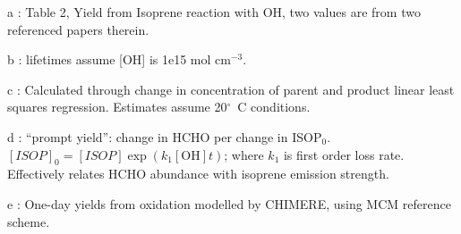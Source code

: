 \begin{table}
\begin{threeparttable}
\begin{tabular}{  l  l  l  l  }
            \bottomrule
          \end{tabular}
          \begin{tablenotes} %
            \item a \textcite{AtkinsonArey2003}: Table 2, Yield from Isoprene reaction with OH, two values are from two referenced papers therein.
            \item b \textcite{Palmer2003}: lifetimes assume [OH] is 1e15 mol cm$^{-3}$.
            \item c \parencite{Lee2006}: Calculated through change in concentration of parent and product linear least squares regression.
            Estimates assume 20$^\circ$~C conditions.
            \item d \textcite{Wolfe2016}: ``prompt yield'': change in HCHO per change in ISOP$_0$.
            $[ISOP]_0=[ISOP]\exp(k_1[\mathrm{OH}]t)$; where $k_1$ is first order loss rate.
            Effectively relates HCHO abundance with isoprene emission strength.
            \item e \textcite{Dufour2009}: One-day yields from oxidation modelled by CHIMERE, using MCM reference scheme.
          \end{tablenotes}
          \label{BioIsop:method:tab_VOCLiteratureYields}
        \end{threeparttable} \end{table}
      

